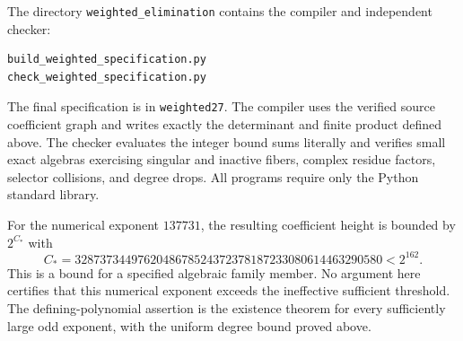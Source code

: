 \documentclass[11pt,a4paper]{article}
\begin{document}
The directory \texttt{weighted\_elimination} contains the compiler and
independent checker:
\begin{verbatim}
build_weighted_specification.py
check_weighted_specification.py
\end{verbatim}
The final specification is in \texttt{weighted27}. The compiler uses the verified source
coefficient graph and writes exactly the determinant and finite product
defined above. The checker evaluates the integer bound sums literally
and verifies small exact algebras exercising singular and inactive
fibers, complex residue factors, selector collisions, and degree drops.
All programs require only the Python standard library.

For the numerical exponent $137731$, the resulting coefficient height
is bounded by $2^{C_*}$ with
\[
 C_*=3287373449762048678524372378187233080614463290580<2^{162}.
\]
This is a bound for a specified algebraic family member. No argument
here certifies that this numerical exponent exceeds the ineffective
sufficient threshold. The defining-polynomial assertion is the
existence theorem for every sufficiently large odd exponent, with
the uniform degree bound proved above.
\end{document}

